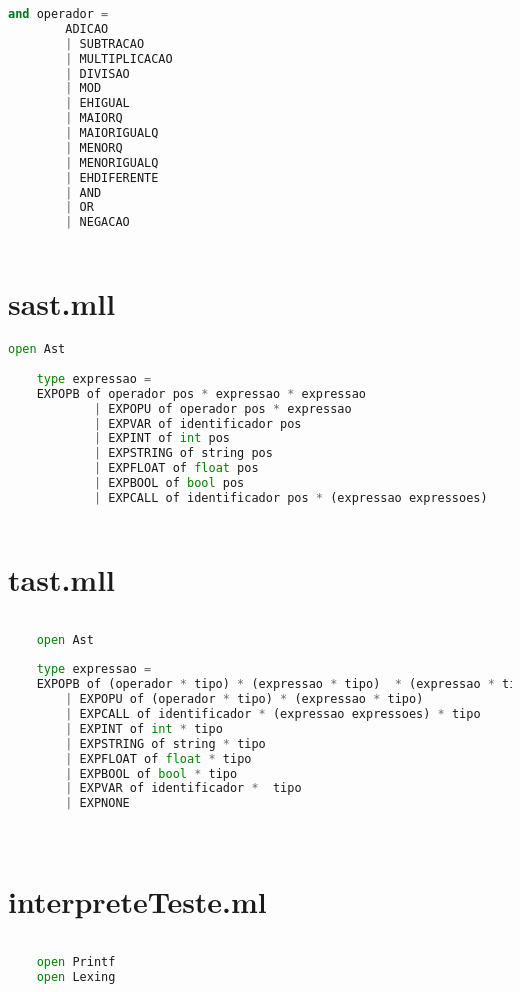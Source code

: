 \documentclass[hidelinks,12pt]{article}
\begin{document}
\begin{appendices}
\begin{lstlisting}[caption=ast.mll, language=python]
		and operador =  
		ADICAO  					
		| SUBTRACAO  				
		| MULTIPLICACAO  				
		| DIVISAO  				
		| MOD					
		| EHIGUAL  			
		| MAIORQ  				
		| MAIORIGUALQ				
		| MENORQ					
		| MENORIGUALQ 			
		| EHDIFERENTE 				
		| AND 						   
		| OR	
		| NEGACAO
		

	\end{lstlisting}
	
	\newpage
	\chapter{sast.mll}
	
	\begin{lstlisting}[caption=sast.mll, language=python]
	open Ast
	
	type expressao =
	EXPOPB of operador pos * expressao * expressao
			| EXPOPU of operador pos * expressao
			| EXPVAR of identificador pos
			| EXPINT of int pos
			| EXPSTRING of string pos
			| EXPFLOAT of float pos 
			| EXPBOOL of bool pos
			| EXPCALL of identificador pos * (expressao expressoes)
	

	\end{lstlisting}
	
	\newpage
	\chapter{tast.mll}
	
	\begin{lstlisting}[caption=tast.mll, language=python]
	
	open Ast
	
	type expressao = 	
	EXPOPB of (operador * tipo) * (expressao * tipo)  * (expressao * tipo)
		| EXPOPU of (operador * tipo) * (expressao * tipo)
		| EXPCALL of identificador * (expressao expressoes) * tipo
		| EXPINT of int * tipo
		| EXPSTRING of string * tipo
		| EXPFLOAT of float * tipo
		| EXPBOOL of bool * tipo
		| EXPVAR of identificador *  tipo
		| EXPNONE

	
	\end{lstlisting}
	
	\newpage
	\chapter{interpreteTeste.ml}
	
	\begin{lstlisting}[caption=interpreteTeste.ml, language=python]
	
	open Printf
	open Lexing
	

\end{lstlisting}
\end{appendices}
\end{document}

